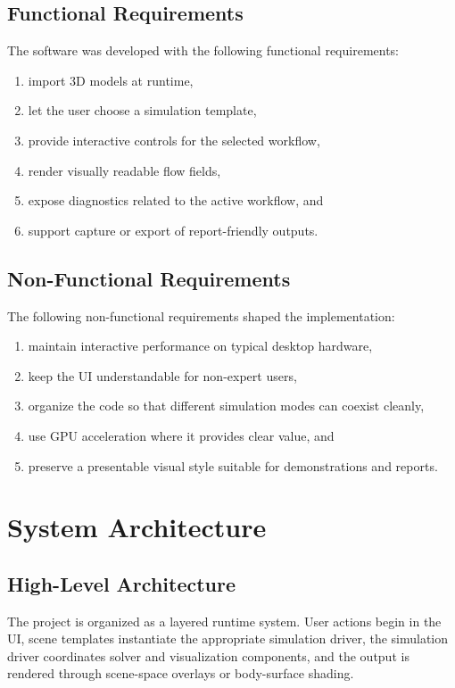 \documentclass[12pt,a4paper,titlepage]{report}
\begin{document}
\section{Functional Requirements}
The software was developed with the following functional requirements:
\begin{enumerate}
\item import 3D models at runtime,
\item let the user choose a simulation template,
\item provide interactive controls for the selected workflow,
\item render visually readable flow fields,
\item expose diagnostics related to the active workflow, and
\item support capture or export of report-friendly outputs.
\end{enumerate}

\section{Non-Functional Requirements}
The following non-functional requirements shaped the implementation:
\begin{enumerate}
\item maintain interactive performance on typical desktop hardware,
\item keep the UI understandable for non-expert users,
\item organize the code so that different simulation modes can coexist cleanly,
\item use GPU acceleration where it provides clear value, and
\item preserve a presentable visual style suitable for demonstrations and reports.
\end{enumerate}

\chapter{System Architecture}
\section{High-Level Architecture}
The project is organized as a layered runtime system. User actions begin in the UI, scene templates instantiate the appropriate simulation driver, the simulation driver coordinates solver and visualization components, and the output is rendered through scene-space overlays or body-surface shading.
\end{document}
